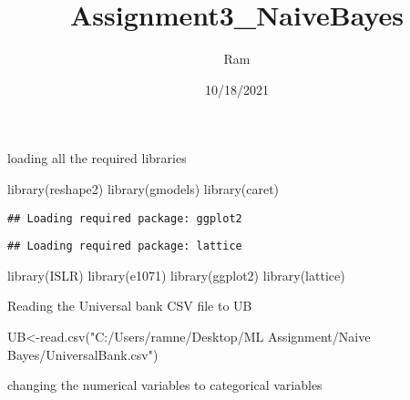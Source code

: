 \documentclass[
]{article}
\title{Assignment3\_NaiveBayes}
\author{Ram}
\date{10/18/2021}
\newenvironment{Shaded}{\begin{snugshade}}{\end{snugshade}}
\newcommand{\FunctionTok}[1]{\textcolor[rgb]{0.00,0.00,0.00}{#1}}
\newcommand{\NormalTok}[1]{#1}
\newcommand{\OtherTok}[1]{\textcolor[rgb]{0.56,0.35,0.01}{#1}}
\newcommand{\SpecialCharTok}[1]{\textcolor[rgb]{0.00,0.00,0.00}{#1}}
\newcommand{\StringTok}[1]{\textcolor[rgb]{0.31,0.60,0.02}{#1}}
\begin{document}
\maketitle

loading all the required libraries

\begin{Shaded}
\begin{Highlighting}[]
\FunctionTok{library}\NormalTok{(reshape2)}
\FunctionTok{library}\NormalTok{(gmodels)}
\FunctionTok{library}\NormalTok{(caret)}
\end{Highlighting}
\end{Shaded}

\begin{verbatim}
## Loading required package: ggplot2
\end{verbatim}

\begin{verbatim}
## Loading required package: lattice
\end{verbatim}

\begin{Shaded}
\begin{Highlighting}[]
\FunctionTok{library}\NormalTok{(ISLR)}
\FunctionTok{library}\NormalTok{(e1071)}
\FunctionTok{library}\NormalTok{(ggplot2)}
\FunctionTok{library}\NormalTok{(lattice)}
\end{Highlighting}
\end{Shaded}

Reading the Universal bank CSV file to UB

\begin{Shaded}
\begin{Highlighting}[]
\NormalTok{UB}\OtherTok{\textless{}{-}}\FunctionTok{read.csv}\NormalTok{(}\StringTok{"C:/Users/ramne/Desktop/ML Assignment/Naive Bayes/UniversalBank.csv"}\NormalTok{)}
\end{Highlighting}
\end{Shaded}

changing the numerical variables to categorical variables

\begin{Shaded}
\end{Shaded}
\end{document}
